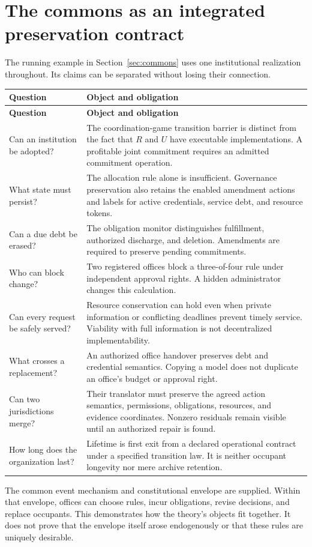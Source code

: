 \documentclass[11pt,letterpaper]{article}
\theoremstyle{plain}
\theoremstyle{definition}
\theoremstyle{remark}
\begin{document}
\appendix
\section{The commons as an integrated preservation contract}\label{app:allocation}
The running example in Section~\ref{sec:commons} uses one institutional realization throughout. Its claims can be separated without losing their connection.
\begin{longtable}{@{}P{.25\linewidth}P{.69\linewidth}@{}}
\toprule
\textbf{Question} & \textbf{Object and obligation}\\\midrule
\endfirsthead
\toprule\textbf{Question}&\textbf{Object and obligation}\\\midrule\endhead
Can an institution be adopted? & The coordination-game transition barrier is distinct from the fact that $R$ and $U$ have executable implementations. A profitable joint commitment requires an admitted commitment operation.\\[.5em]
What state must persist? & The allocation rule alone is insufficient. Governance preservation also retains the enabled amendment actions and labels for active credentials, service debt, and resource tokens.\\[.5em]
Can a due debt be erased? & The obligation monitor distinguishes fulfillment, authorized discharge, and deletion. Amendments are required to preserve pending commitments.\\[.5em]
Who can block change? & Two registered offices block a three-of-four rule under independent approval rights. A hidden administrator changes this calculation.\\[.5em]
Can every request be safely served? & Resource conservation can hold even when private information or conflicting deadlines prevent timely service. Viability with full information is not decentralized implementability.\\[.5em]
What crosses a replacement? & An authorized office handover preserves debt and credential semantics. Copying a model does not duplicate an office's budget or approval right.\\[.5em]
Can two jurisdictions merge? & Their translator must preserve the agreed action semantics, permissions, obligations, resources, and evidence coordinates. Nonzero residuals remain visible until an authorized repair is found.\\[.5em]
How long does the organization last? & Lifetime is first exit from a declared operational contract under a specified transition law. It is neither occupant longevity nor mere archive retention.\\
\bottomrule
\end{longtable}
The common event mechanism and constitutional envelope are supplied. Within that envelope, offices can choose rules, incur obligations, revise decisions, and replace occupants. This demonstrates how the theory's objects fit together. It does not prove that the envelope itself arose endogenously or that these rules are uniquely desirable.
\end{document}
